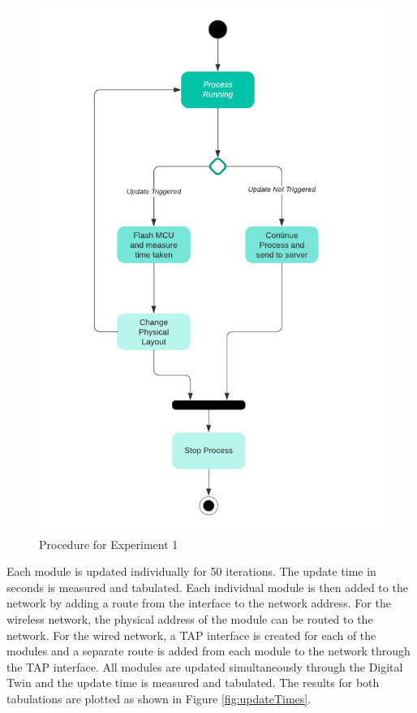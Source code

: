 \begin{figure}
    \centering
    \includegraphics{images/Exp 1.png}
    \caption{Procedure for Experiment 1}
    \label{fig:exp1}
\end{figure}

Each module is updated individually for 50 iterations. The update time in seconds is measured and tabulated. Each individual module is then added to the network by adding a route from the interface to the network address. For the wireless network, the physical address of the module can be routed to the network. For the wired network, a TAP interface is created for each of the modules and a separate route is added from each module to the network through the TAP interface. All modules are updated simultaneously through the Digital Twin and the update time is measured and tabulated. The results for both tabulations are plotted as shown in Figure \ref{fig:updateTimes}.


